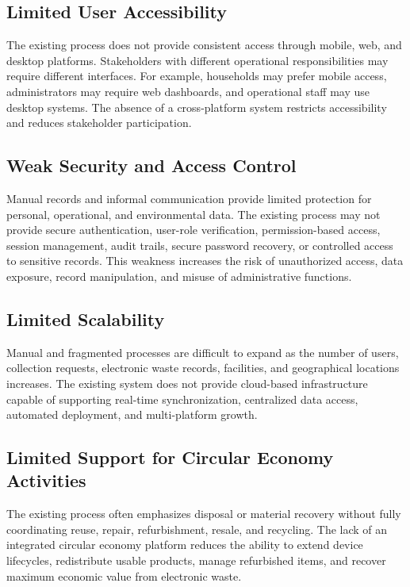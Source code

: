 \subsection{Limited User Accessibility}
The existing process does not provide consistent access through mobile, web, and
desktop platforms. Stakeholders with different operational responsibilities may
require different interfaces. For example, households may prefer mobile access,
administrators may require web dashboards, and operational staff may use
desktop systems. The absence of a cross-platform system restricts accessibility
and reduces stakeholder participation.

\subsection{Weak Security and Access Control}
Manual records and informal communication provide limited protection for
personal, operational, and environmental data. The existing process may not
provide secure authentication, user-role verification, permission-based access,
session management, audit trails, secure password recovery, or controlled access
to sensitive records. This weakness increases the risk of unauthorized access,
data exposure, record manipulation, and misuse of administrative functions.

\subsection{Limited Scalability}
Manual and fragmented processes are difficult to expand as the number of users,
collection requests, electronic waste records, facilities, and geographical locations
increases. The existing system does not provide cloud-based infrastructure
capable of supporting real-time synchronization, centralized data access,
automated deployment, and multi-platform growth.

\subsection{Limited Support for Circular Economy Activities}
The existing process often emphasizes disposal or material recovery without fully
coordinating reuse, repair, refurbishment, resale, and recycling. The lack of an
integrated circular economy platform reduces the ability to extend device
lifecycles, redistribute usable products, manage refurbished items, and recover
maximum economic value from electronic waste.

